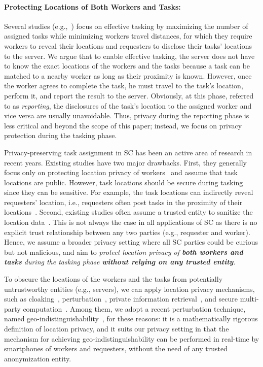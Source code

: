\documentclass{USC-Thesis}
\numberwithin{equation}{chapter}
\begin{document}
\paragraph{Protecting Locations of Both Workers and Tasks:} Several studies (e.g.,~\cite{kazemi2012geocrowd,tran2017real}) focus on effective tasking by maximizing the number of assigned tasks while minimizing workers travel distances, for which they require workers to reveal their locations and requesters to disclose their tasks' locations to the server. We argue that to enable effective tasking, the server does not have to know the exact locations of the workers and the tasks because a task can be matched to a nearby worker as long as their proximity is known. However, once the worker agrees to complete the task, he must travel to the task's location, perform it, and report the result to the server. Obviously, at this phase, referred to as \emph{reporting}, the disclosures of the task's location to the assigned worker and vice versa are usually unavoidable. Thus, privacy during the reporting phase is less critical and beyond the scope of this paper; instead, we focus on privacy protection during the tasking phase.

Privacy-preserving task assignment in SC has been an active area of research in recent years. Existing studies have two major drawbacks. First, they generally focus only on protecting location privacy of workers~\cite{to2014framework,Gong2015,Shen2016} and assume that task locations are public. However, task locations should be secure during tasking since they can be sensitive.
For example, the task locations can indirectly reveal requesters' location, i.e., requesters often post tasks in the proximity of their locations~\cite{to2017location}.
Second, existing studies often assume a trusted entity to sanitize the location data~\cite{kazemi2011privacy,pournajaf2014spatial,to2014framework}. This is not always the case in all applications of SC as there is no explicit trust relationship between any two parties (e.g., requester and worker).
Hence, we assume a broader privacy setting where all SC parties could be curious but not malicious, and aim to \emph{protect location privacy of \textbf{both workers and tasks} during the tasking phase \textbf{without relying on any trusted entity}}.

To obscure the locations of the workers and the tasks from potentially untrustworthy entities (e.g., servers), we can apply location privacy mechanisms, such as cloaking~\cite{gruteser2003anonymous}, perturbation~\cite{andres2013geo,xiao2015protecting}, private information retrieval~\cite{ghinita2008private}, and secure multi-party computation~\cite{goryczka2015comprehensive}. Among them, we adopt a recent perturbation technique, named geo-indistinguishability~\cite{andres2013geo}, for these reasons: it is a mathematically rigorous definition of location privacy, and it suits our privacy setting in that the mechanism for achieving geo-indistinguishability can be performed in real-time by smartphones of workers and requesters, without the need of any trusted anonymization entity.
\end{document}
